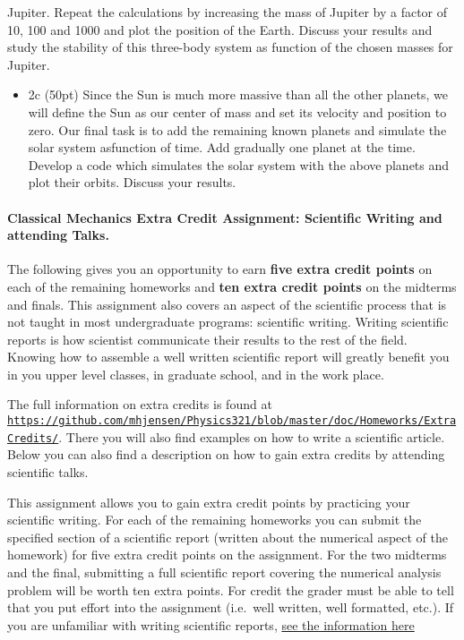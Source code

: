 \documentclass[%
oneside,                 %
final,                   %
10pt]{article}
\begin{document}
\noindent
Jupiter. Repeat the calculations by increasing the mass of Jupiter by a factor of 10, 100 and 1000 and plot the position of the Earth.  Discuss your results and study the stability of this three-body system as function of the chosen
masses for Jupiter.

\begin{itemize}
\item 2c (50pt) Since the Sun is much more massive than all the other planets, we will define the Sun as our center of mass and set its velocity and position to zero.  Our final task is to add the remaining known planets and simulate the solar system asfunction of time. Add gradually one planet at the time. Develop a code which simulates the solar system with the above planets and plot their orbits. Discuss your results.
\end{itemize}

\noindent
\paragraph{Classical Mechanics Extra Credit Assignment: Scientific Writing and attending Talks.}
The following gives you an opportunity to earn \textbf{five extra credit
points} on each of the remaining homeworks and \textbf{ten extra credit points}
on the midterms and finals.  This assignment also covers an aspect of
the scientific process that is not taught in most undergraduate
programs: scientific writing.  Writing scientific reports is how
scientist communicate their results to the rest of the field.  Knowing
how to assemble a well written scientific report will greatly benefit
you in you upper level classes, in graduate school, and in the work
place.

The full information on extra credits is found at \href{{https://github.com/mhjensen/Physics321/blob/master/doc/Homeworks/ExtraCredits/}}{\nolinkurl{https://github.com/mhjensen/Physics321/blob/master/doc/Homeworks/ExtraCredits/}}. There you will also find examples on how to write a scientific article. 
Below you can also find a description on how to gain extra credits by attending scientific talks.


This assignment allows you to gain extra credit points by practicing
your scientific writing.  For each of the remaining homeworks you can
submit the specified section of a scientific report (written about the
numerical aspect of the homework) for five extra credit points on the
assignment.  For the two midterms and the final, submitting a full
scientific report covering the numerical analysis problem will be
worth ten extra points.  For credit the grader must be able to tell
that you put effort into the assignment (i.e.~well written, well
formatted, etc.).  If you are unfamiliar with writing scientific
reports, \href{{https://github.com/mhjensen/Physics321/blob/master/doc/Homeworks/ExtraCredits/IntroductionScientificWriting.md}}{see the information here}
\end{document}
